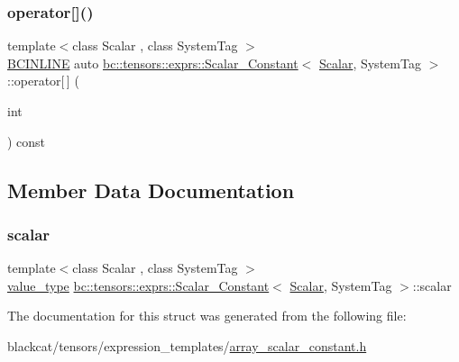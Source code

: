 \mbox{\label{structbc_1_1tensors_1_1exprs_1_1Scalar__Constant_aadf4d28e113f649c9aa6ba4a71298dcb}} 
\subsubsection{\texorpdfstring{operator[]()}{operator[]()}}
{\footnotesize\ttfamily template$<$class Scalar , class System\+Tag $>$ \\
\hyperlink{common_8h_a6699e8b0449da5c0fafb878e59c1d4b1}{B\+C\+I\+N\+L\+I\+NE} auto \hyperlink{structbc_1_1tensors_1_1exprs_1_1Scalar__Constant}{bc\+::tensors\+::exprs\+::\+Scalar\+\_\+\+Constant}$<$ \hyperlink{namespacebc_aa12ac55ee2c43dc082894dd3859daee1}{Scalar}, System\+Tag $>$\+::operator\mbox{[}$\,$\mbox{]} (\begin{DoxyParamCaption}\item[{int}]{ }\end{DoxyParamCaption}) const\hspace{0.3cm}{\ttfamily [inline]}}



\subsection{Member Data Documentation}
\mbox{\label{structbc_1_1tensors_1_1exprs_1_1Scalar__Constant_abd370a68cb7496699dc4805955658856}} 
\subsubsection{\texorpdfstring{scalar}{scalar}}
{\footnotesize\ttfamily template$<$class Scalar , class System\+Tag $>$ \\
\hyperlink{structbc_1_1Shape_3_010_01_4_a342cb50fc2de91d730a07750321bf986}{value\+\_\+type} \hyperlink{structbc_1_1tensors_1_1exprs_1_1Scalar__Constant}{bc\+::tensors\+::exprs\+::\+Scalar\+\_\+\+Constant}$<$ \hyperlink{namespacebc_aa12ac55ee2c43dc082894dd3859daee1}{Scalar}, System\+Tag $>$\+::scalar}



The documentation for this struct was generated from the following file\+:\begin{DoxyCompactItemize}
\item 
blackcat/tensors/expression\+\_\+templates/\hyperlink{array__scalar__constant_8h}{array\+\_\+scalar\+\_\+constant.\+h}\end{DoxyCompactItemize}
